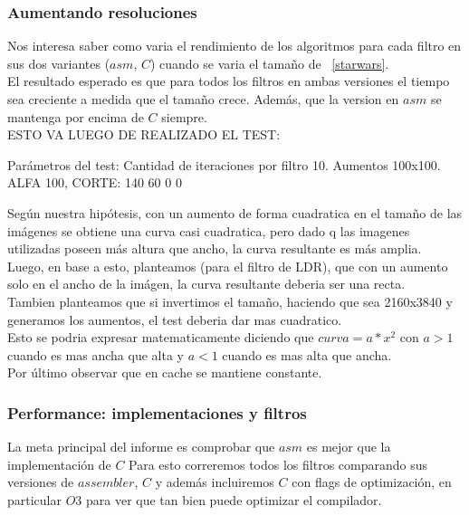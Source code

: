 \subsubsection{Aumentando resoluciones}

Nos interesa saber como varia el rendimiento de los algoritmos para cada filtro en sus dos variantes ($asm$, $C$) cuando se varia el tamaño de ~\ref{starwars}.\\

El resultado esperado es que para todos los filtros en ambas versiones el tiempo sea creciente a medida que el tamaño crece. Además, que la version en $asm$ se mantenga por encima de $C$ siempre. \\ 


ESTO VA LUEGO DE REALIZADO EL TEST:

Parámetros del test: 
Cantidad de iteraciones por filtro 10. Aumentos 100x100.
ALFA 100, CORTE: 140 60 0 0

Según nuestra hipótesis, con un aumento de forma cuadratica en el tamaño de las imágenes se obtiene una curva casi cuadratica, pero dado q las imagenes utilizadas poseen más altura que ancho, la curva resultante es más amplia. \\

Luego, en base a esto, planteamos (para el filtro de LDR), que con un aumento solo en el ancho de la imágen, la curva resultante deberia ser una recta. \\

Tambien planteamos que si invertimos el tamaño, haciendo que sea 2160x3840 y generamos los aumentos, el test deberia dar mas cuadratico. \\

Esto se podria expresar matematicamente diciendo que $curva =a*x^2$ con $a>1$ cuando es mas ancha que alta y $a<1$ cuando es mas alta que ancha. \\

Por último observar que en cache se mantiene constante. \\

\subsubsection{Performance: implementaciones y filtros}

La meta principal del informe es comprobar que $asm$ es mejor que la implementación de $C$
Para esto correremos todos los filtros comparando sus versiones de $assembler$, $C$ y además incluiremos $C$ con flags de optimización, en particular $O3$ para ver que tan bien puede optimizar el compilador. \\


